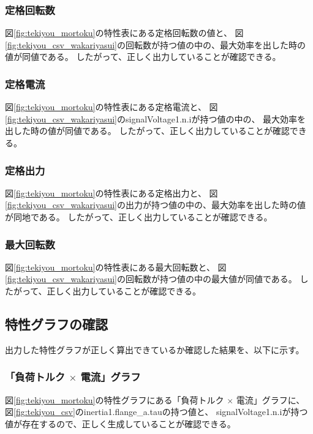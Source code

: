 \subsubsection{定格回転数}
図\ref{fig:tekiyou_mortoku}の特性表にある定格回転数の値と、
図\ref{fig:tekiyou_csv_wakariyasui}の回転数が持つ値の中の、最大効率を出した時の値が同値である。
したがって、正しく出力していることが確認できる。

\subsubsection{定格電流}
図\ref{fig:tekiyou_mortoku}の特性表にある定格電流と、
図\ref{fig:tekiyou_csv_wakariyasui}のsignalVoltage1.n.iが持つ値の中の、
最大効率を出した時の値が同値である。
したがって、正しく出力していることが確認できる。

\subsubsection{定格出力}
図\ref{fig:tekiyou_mortoku}の特性表にある定格出力と、
図\ref{fig:tekiyou_csv_wakariyasui}の出力が持つ値の中の、最大効率を出した時の値が同地である。
したがって、正しく出力していることが確認できる。

\subsubsection{最大回転数}
図\ref{fig:tekiyou_mortoku}の特性表にある最大回転数と、
図\ref{fig:tekiyou_csv_wakariyasui}の回転数が持つ値の中の最大値が同値である。
したがって、正しく出力していることが確認できる。

\subsection{特性グラフの確認}
出力した特性グラフが正しく算出できているか確認した結果を、以下に示す。

\subsubsection{「負荷トルク $\times$ 電流」グラフ}
図\ref{fig:tekiyou_mortoku}の特性グラフにある「負荷トルク $\times$ 電流」グラフに、
図\ref{fig:tekiyou_csv}のinertia1.flange\_a.tauの持つ値と、
signalVoltage1.n.iが持つ値が存在するので、正しく生成していることが確認できる。

